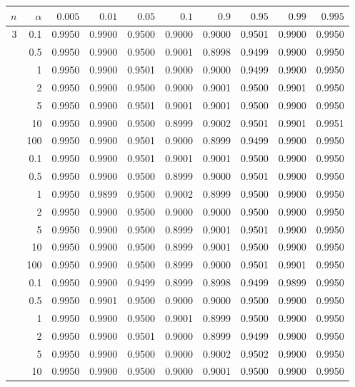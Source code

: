 \begin{tabular}{rrrrrrrrrr}
\toprule
$n$ & $\alpha$ & $0.005$ & $0.01$ & $0.05$ & $0.1$ & $0.9$ & $0.95$ & $0.99$ & $0.995$ \\
\midrule
3 & 0.1 & 0.9950 & 0.9900 & 0.9500 & 0.9000 & 0.9000 & 0.9501 & 0.9900 & 0.9950 \\
 & 0.5 & 0.9950 & 0.9900 & 0.9500 & 0.9001 & 0.8998 & 0.9499 & 0.9900 & 0.9950 \\
 & 1 & 0.9950 & 0.9900 & 0.9501 & 0.9000 & 0.9000 & 0.9499 & 0.9900 & 0.9950 \\
 & 2 & 0.9950 & 0.9900 & 0.9500 & 0.9000 & 0.9001 & 0.9500 & 0.9901 & 0.9950 \\
 & 5 & 0.9950 & 0.9900 & 0.9501 & 0.9001 & 0.9001 & 0.9500 & 0.9900 & 0.9950 \\
 & 10 & 0.9950 & 0.9900 & 0.9500 & 0.8999 & 0.9002 & 0.9501 & 0.9901 & 0.9951 \\
 & 100 & 0.9950 & 0.9900 & 0.9501 & 0.9000 & 0.8999 & 0.9499 & 0.9900 & 0.9950 \\
\addlinespace
5 & 0.1 & 0.9950 & 0.9900 & 0.9501 & 0.9001 & 0.9001 & 0.9500 & 0.9900 & 0.9950 \\
 & 0.5 & 0.9950 & 0.9900 & 0.9500 & 0.8999 & 0.9000 & 0.9501 & 0.9900 & 0.9950 \\
 & 1 & 0.9950 & 0.9899 & 0.9500 & 0.9002 & 0.8999 & 0.9500 & 0.9900 & 0.9950 \\
 & 2 & 0.9950 & 0.9900 & 0.9500 & 0.9000 & 0.9000 & 0.9500 & 0.9900 & 0.9950 \\
 & 5 & 0.9950 & 0.9900 & 0.9500 & 0.8999 & 0.9001 & 0.9501 & 0.9900 & 0.9950 \\
 & 10 & 0.9950 & 0.9900 & 0.9500 & 0.8999 & 0.9001 & 0.9500 & 0.9900 & 0.9950 \\
 & 100 & 0.9950 & 0.9900 & 0.9500 & 0.8999 & 0.9000 & 0.9501 & 0.9901 & 0.9950 \\
\addlinespace
10 & 0.1 & 0.9950 & 0.9900 & 0.9499 & 0.8999 & 0.8998 & 0.9499 & 0.9899 & 0.9950 \\
 & 0.5 & 0.9950 & 0.9901 & 0.9500 & 0.9000 & 0.9000 & 0.9500 & 0.9900 & 0.9950 \\
 & 1 & 0.9950 & 0.9900 & 0.9500 & 0.9001 & 0.8999 & 0.9500 & 0.9900 & 0.9950 \\
 & 2 & 0.9950 & 0.9900 & 0.9501 & 0.9000 & 0.8999 & 0.9499 & 0.9900 & 0.9950 \\
 & 5 & 0.9950 & 0.9900 & 0.9500 & 0.9000 & 0.9002 & 0.9502 & 0.9900 & 0.9950 \\
 & 10 & 0.9950 & 0.9900 & 0.9500 & 0.9000 & 0.9001 & 0.9500 & 0.9900 & 0.9950 \\

\end{tabular}
